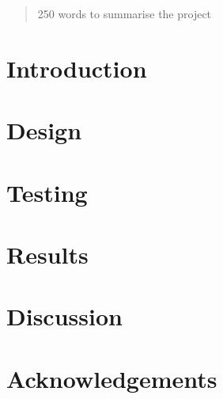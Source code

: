 \documentclass[12pt,twoside]{article}
\begin{document}


\begin{abstract}
    250 words to summarise the project
    
\end{abstract}

\newpage

\section{Introduction}



\section{Design}


\section{Testing}


\section{Results}


\section{Discussion}


\section{Acknowledgements}

\newpage

%


\appendix
\end{document}
